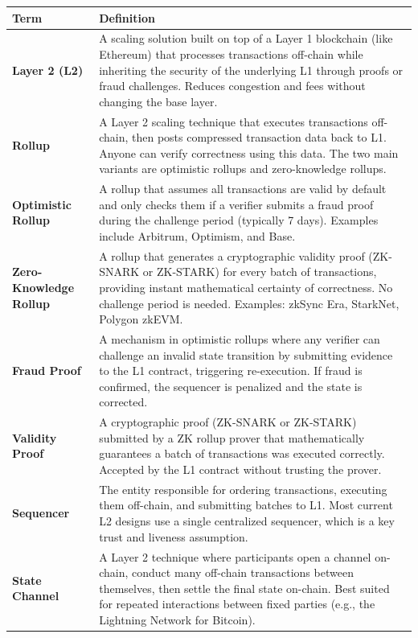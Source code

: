 \documentclass[11pt,a4paper]{article}
\begin{document}
\renewcommand{\arraystretch}{1.25}
\noindent\begin{tabular}{@{}p{3.6cm}p{11.0cm}@{}}
\toprule
\textbf{Term} & \textbf{Definition} \\
\midrule
\textbf{Layer 2 (L2)}               & A scaling solution built on top of a Layer 1 blockchain (like Ethereum) that processes transactions off-chain while inheriting the security of the underlying L1 through proofs or fraud challenges. Reduces congestion and fees without changing the base layer. \\
\textbf{Rollup}                     & A Layer 2 scaling technique that executes transactions off-chain, then posts compressed transaction data back to L1. Anyone can verify correctness using this data. The two main variants are optimistic rollups and zero-knowledge rollups. \\
\textbf{Optimistic Rollup}          & A rollup that assumes all transactions are valid by default and only checks them if a verifier submits a fraud proof during the challenge period (typically 7 days). Examples include Arbitrum, Optimism, and Base. \\
\textbf{Zero-Knowledge Rollup}      & A rollup that generates a cryptographic validity proof (ZK-SNARK or ZK-STARK) for every batch of transactions, providing instant mathematical certainty of correctness. No challenge period is needed. Examples: zkSync Era, StarkNet, Polygon zkEVM. \\
\textbf{Fraud Proof}                & A mechanism in optimistic rollups where any verifier can challenge an invalid state transition by submitting evidence to the L1 contract, triggering re-execution. If fraud is confirmed, the sequencer is penalized and the state is corrected. \\
\textbf{Validity Proof}             & A cryptographic proof (ZK-SNARK or ZK-STARK) submitted by a ZK rollup prover that mathematically guarantees a batch of transactions was executed correctly. Accepted by the L1 contract without trusting the prover. \\
\textbf{Sequencer}                  & The entity responsible for ordering transactions, executing them off-chain, and submitting batches to L1. Most current L2 designs use a single centralized sequencer, which is a key trust and liveness assumption. \\
\textbf{State Channel}              & A Layer 2 technique where participants open a channel on-chain, conduct many off-chain transactions between themselves, then settle the final state on-chain. Best suited for repeated interactions between fixed parties (e.g., the Lightning Network for Bitcoin). \\

\end{tabular}
\end{document}
